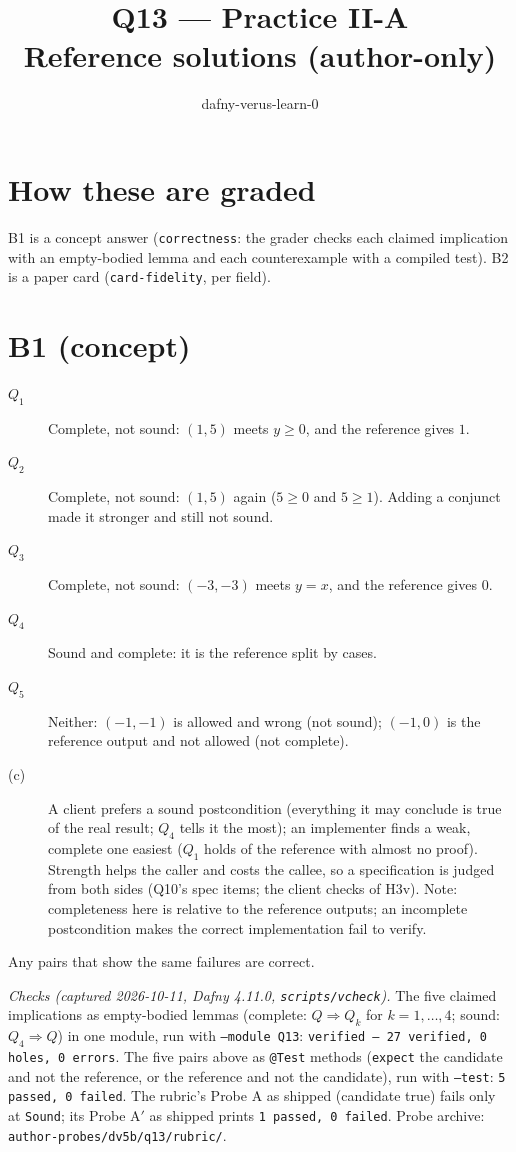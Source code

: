 \documentclass[11pt]{article}
\title{Q13 --- Practice II-A \\ \large Reference solutions (author-only)}
\author{dafny-verus-learn-0}
\date{}
\begin{document}
\maketitle
\sloppy

\section*{How these are graded}
B1 is a concept answer (\texttt{correctness}: the grader checks each claimed
implication with an empty-bodied lemma and each counterexample with a
compiled test). B2 is a paper card (\texttt{card-fidelity}, per field).

\section*{B1 (concept)}

\begin{description}
\item[$Q_1$] Complete, not sound: $(1, 5)$ meets $y \ge 0$, and the reference
  gives $1$.
\item[$Q_2$] Complete, not sound: $(1, 5)$ again ($5 \ge 0$ and $5 \ge 1$).
  Adding a conjunct made it stronger and still not sound.
\item[$Q_3$] Complete, not sound: $(-3, -3)$ meets $y = x$, and the reference
  gives $0$.
\item[$Q_4$] Sound and complete: it is the reference split by cases.
\item[$Q_5$] Neither: $(-1, -1)$ is allowed and wrong (not sound); $(-1, 0)$ is
  the reference output and not allowed (not complete).
\item[(c)] A client prefers a sound postcondition (everything it may conclude
  is true of the real result; $Q_4$ tells it the most); an implementer finds a
  weak, complete one easiest ($Q_1$ holds of the reference with almost no
  proof). Strength helps the caller and costs the callee, so a specification
  is judged from both sides (Q10's spec items; the client checks of H3v).
  Note: completeness here is relative to the reference outputs; an
  incomplete postcondition makes the correct implementation fail to verify.
\end{description}
Any pairs that show the same failures are correct.

\emph{Checks (captured 2026-10-11, Dafny 4.11.0, \texttt{scripts/vcheck}).}
The five claimed implications as empty-bodied lemmas (complete: $Q \Rightarrow
Q_k$ for $k = 1, \dots, 4$; sound: $Q_4 \Rightarrow Q$) in one module, run with
\texttt{--module Q13}: \texttt{verified --- 27 verified, 0 holes, 0 errors}.
The five pairs above as \texttt{@Test} methods (\texttt{expect} the candidate
and not the reference, or the reference and not the candidate), run with
\texttt{--test}: \texttt{5 passed, 0 failed}. The rubric's Probe A as shipped
(candidate \textsf{true}) fails only at \texttt{Sound}; its Probe A$'$ as
shipped prints \texttt{1 passed, 0 failed}. Probe archive:
\texttt{author-probes/dv5b/q13/rubric/}.
\end{document}
